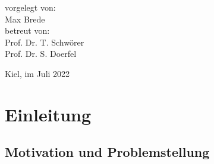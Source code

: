 \documentclass[
  12pt,
  openany]{book}
\begin{document}
\begin{titlepage}
\begin{center}
	\begin{spacing}{2.0}
	{\Large vorgelegt von:}\\
	{\Large Max Brede}\\\vspace*{1.5cm}
	{\Large betreut von:}\\
	{\Large Prof. Dr. T. Schwörer}\\
	{\Large Prof. Dr. S. Doerfel}
	\\\vspace*{1.5cm}
	\end{spacing}
	\vfill
	\begin{spacing}{0.9}
	{\Large Kiel, im Juli 2022}
	\end{spacing}
	\end{center}
\restoregeometry
\end{titlepage}
\newpage
\thispagestyle{empty}
\mbox{}
\newpage

\renewcommand*\contentsname{Inhalt}
{
\setcounter{tocdepth}{1}
\tableofcontents
}
\listoffigures
{}
\hypertarget{einleitung}{%
\chapter{Einleitung}\label{einleitung}}

\hypertarget{motivation-und-problemstellung}{%
\section{Motivation und Problemstellung}\label{motivation-und-problemstellung}}
\end{document}
